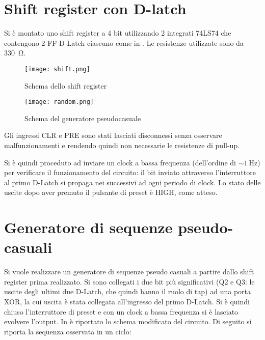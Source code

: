 \section{Shift register con D-latch}
Si è montato uno shift register a 4 bit utilizzando 2 integrati 74LS74 che contengono 2 FF D-Latch ciascuno come in . Le resistenze utilizzate sono da \SI{330}{\ohm}.

	\begin{figure}[h!]

	\end{figure}
	
\begin{figure}[h!]
	\centering
	\begin{minipage}{0.49\textwidth}
		\centering
		\texttt{[image: shift.png]}
		\caption{Schema dello shift register}
		\label{fig:shift}
	\end{minipage}
	\begin{minipage}{0.49\textwidth}
		\centering
		\texttt{[image: random.png]}
		\caption{Schema del generatore pseudocasuale}
		\label{fig:random}
	\end{minipage}
\end{figure}
Gli ingressi CLR e PRE sono stati lasciati disconnessi senza osservare malfunzionamenti e rendendo quindi non necessarie le resistenze di pull-up.

Si è quindi proceduto ad inviare un clock a bassa frequenza (dell'ordine di $\sim\SI{1}{\hertz}$) per verificare il funzionamento del circuito: il bit inviato attraverso l'interruttore al primo D-Latch si propaga nei successivi ad ogni periodo di clock.
Lo stato delle uscite dopo aver premuto il pulsante di preset è HIGH, come atteso.
 
\section{Generatore di sequenze pseudo-casuali}
Si vuole realizzare un generatore di sequenze pseudo casuali a partire dallo shift register prima realizzato. Si sono collegati i due bit più significativi (Q2 e Q3: le uscite degli ultimi due D-Latch, che quindi hanno il ruolo di tap) ad una porta XOR, la cui uscita è stata collegata all'ingresso del primo D-Latch.
Si è quindi chiuso l'interruttore di preset e con un clock a bassa frequenza si è lasciato evolvere l'output. In  è riportato lo schema modificato del circuito.
Di seguito si riporta la sequenza osservata in un ciclo:

